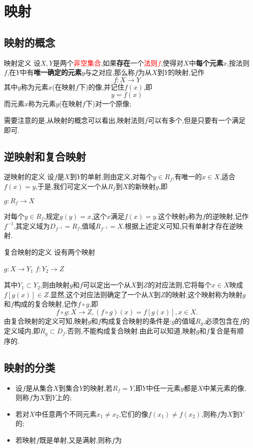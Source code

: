 \section{映射}
\subsection{映射的概念}
\begin{defn}{映射定义}{}
    设$X,Y$是两个\textcolor{red}{非空集合},如果\textbf{存在}一个\textcolor{red}{法则$f$},使得对$X$中\textbf{每个元素}$x$,按法则$f$,在$Y$中有\textbf{唯一确定的元素}$y$与之对应,那么称$f$为从$X$到$Y$的映射,记作
    $$
        f:X \to Y
    $$
    其中$y$称为元素$x$(在映射$f$下)的像,并记住$f(x)$,即
    $$
        y=f(x)
    $$
    而元素$x$称为元素$y$(在映射$f$下)对一个原像;
\end{defn}
需要注意的是,从映射的概念可以看出,映射法则$f$可以有多个,但是只要有一个满足即可.
\subsection{逆映射和复合映射}
\begin{defn}{逆映射的定义}{}
    设$f$是$X$到$Y$的单射,则由定义,对每个$y \in R_f$,有唯一的$x \in X$,适合$f(x)=y$,于是,我们可定义一个从$R_f$到$X$的新映射$g$,即
    \begin{center}
        $g: R_f \to X$
    \end{center}
    对每个$y \in R_f$,规定$g(y)=x$,这个$x$满足$f(x)=y$.这个映射$g$称为$f$的逆映射,记作$f^{-1}$,其定义域为$D_{f^{-1}}=R_f$,值域$R_{f^{-1}}=X$.根据上述定义可知,只有单射才存在逆映射.
\end{defn}
\begin{defn}{复合映射的定义}{}
    设有两个映射
    \begin{center}
        $g: X \to Y_1$ \qquad $f:Y_2 \to Z$
    \end{center}
    其中$Y_1 \subset Y_2$,则由映射$g$和$f$可以定出一个从$X$到$Z$的对应法则,它将每个$x \in X$映成$f[g(x)] \in Z$.显然,这个对应法则确定了一个从$X$到$Z$的映射,这个映射称为映射$g$和$f$构成的复合映射,记作$f \circ g$,即
    $$
        f\circ g:X\to Z,(f\circ g)(x)=f[g(x)],x\in X.
    $$
    由复合映射的定义可知,映射$g$和$f$构成复合映射的条件是:$g$的值域$R_g$,必须包含在$f$的定义域内,即$R_g \subset D_f$.否则,不能构成复合映射.由此可以知道,映射$g$和$f$复合是有顺序的.
\end{defn}
\subsection{映射的分类}
\begin{itemize}
    \item 设$f$是从集合$X$到集合$Y$的映射,若$R_f=Y$,即$Y$中任一元素$y$都是$X$中某元素的像,则称$f$为$X$到$Y$上的;
    \item 若对$X$中任意两个不同元素$x_1 \neq x_2$,它们的像$f(x_1) \neq f(x_2)$,则称$f$为$X$到$Y$的;
    \item 若映射$f$既是单射,又是满射,则称$f$为
\end{itemize}
